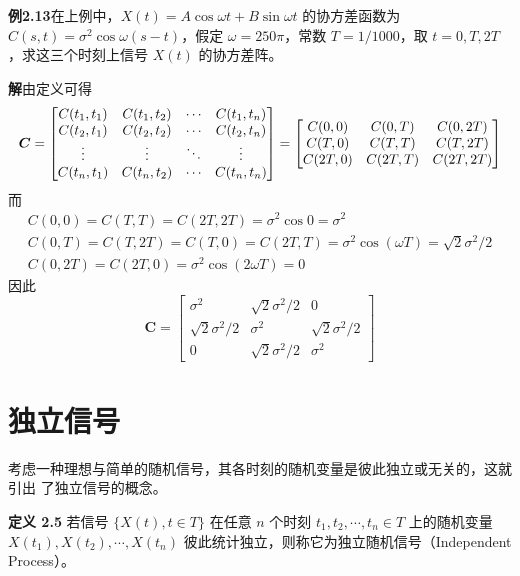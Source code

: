 \documentclass[11pt,openany,UTF8]{ctexbook}
\newcommand{\thm}[1]{\par\medskip\noindent\textbf{#1}\quad}
\begin{document}
\begin{examplebox}
\textbf{例2.13}\quad 在上例中\nobreak，$X(t)=A\cos\omega t+B\sin\omega t$ 的协方差函数为 $C(s,t)=\sigma^2\cos\omega(s-t)$\nobreak，假定 $\omega=250\pi$\nobreak，常数 $T=1/1000$\nobreak，取 $t=0,T,2T$\nobreak，求这三个时刻上信号 $X(t)$ 的协方差阵\nobreak。

\textbf{解}\quad 由定义可得
\[
\resizebox{\linewidth}{!}{$\displaystyle
\bm{C}=\begin{bmatrix}
C(t_1,t_1) & C(t_1,t_2) & \cdots & C(t_1,t_n)\\
C(t_2,t_1) & C(t_2,t_2) & \cdots & C(t_2,t_n)\\
\vdots & \vdots & \ddots & \vdots\\
C(t_n,t_1) & C(t_n,t_2) & \cdots & C(t_n,t_n)
\end{bmatrix}
=\begin{bmatrix}
C(0,0) & C(0,T) & C(0,2T)\\
C(T,0) & C(T,T) & C(T,2T)\\
C(2T,0) & C(2T,T) & C(2T,2T)
\end{bmatrix}$}
\]
而
\[
\begin{gathered}
C(0,0)=C(T,T)=C(2T,2T)=\sigma^2\cos 0=\sigma^2\\
C(0,T)=C(T,2T)=C(T,0)=C(2T,T)=\sigma^2\cos(\omega T)=\sqrt{2}\sigma^2/2\\
C(0,2T)=C(2T,0)=\sigma^2\cos(2\omega T)=0
\end{gathered}
\]
因此
\[
\bm{C}=\begin{bmatrix}
\sigma^2 & \sqrt{2}\sigma^2/2 & 0\\
\sqrt{2}\sigma^2/2 & \sigma^2 & \sqrt{2}\sigma^2/2\\
0 & \sqrt{2}\sigma^2/2 & \sigma^2
\end{bmatrix}
\]
\end{examplebox}

\section{独立信号}
考虑一种理想与简单的随机信号\nobreak，其各时刻的随机变量是彼此独立或无关的\nobreak，这就引出
了独立信号的概念\nobreak。

\thm{定义 2.5} 若信号 $\{X(t),t\in T\}$ 在任意 $n$ 个时刻 $t_1,t_2,\cdots,t_n\in T$ 上的随机变量 $X(t_1),X(t_2),\cdots,X(t_n)$ 彼此统计独立\nobreak，则称它为独立随机信号（Independent Process\nobreak）\nobreak。
\end{document}
